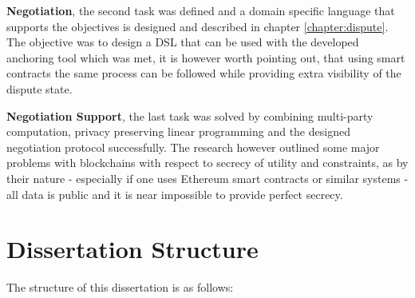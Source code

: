 \documentclass[12pt,msc,a4paper,oneside]{ucl_thesis}
\begin{document}
\textbf{Negotiation}, the second task was defined and a domain specific language that supports the objectives is designed and described in chapter \ref{chapter:dispute}. The objective was to design a DSL that can be used with the developed anchoring tool which was met, it is however worth pointing out, that using smart contracts the same process can be followed while providing extra visibility of the dispute state.

\textbf{Negotiation Support}, the last task was solved by combining multi-party computation, privacy preserving linear programming and the designed negotiation protocol successfully. The research however outlined some major problems with blockchains with respect to secrecy of utility and constraints, as by their nature - especially if one uses Ethereum smart contracts or similar systems - all data is public and it is near impossible to provide perfect secrecy.

\section{Dissertation Structure}
The structure of this dissertation is as follows:
\end{document}

